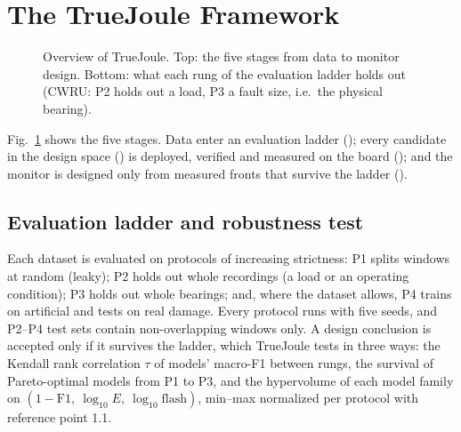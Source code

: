 \documentclass[conference]{IEEEtran}
\newcommand{\TJ}{TrueJoule}
\begin{document}
\section{The \TJ{} Framework}\label{sec:tj}
\begin{figure}[t]
\centering

\caption{Overview of \TJ{}. Top: the five stages from data to monitor design. Bottom: what each rung of the evaluation
ladder holds out (CWRU: P2 holds out a load, P3 a fault size, i.e.\ the physical bearing).}
\label{fig:overview}
\end{figure}

Fig.~\ref{fig:overview} shows the five stages. Data enter an evaluation ladder (); every candidate in the
design space () is deployed, verified and measured on the board (); and the monitor is designed
only from measured fronts that survive the ladder ().

\subsection{Evaluation ladder and robustness test}\label{sec:tj-ladder}
Each dataset is evaluated on protocols of increasing strictness: P1 splits windows at random (leaky); P2 holds out
whole recordings (a load or an operating condition); P3 holds out whole bearings; and, where the dataset allows, P4
trains on artificial and tests on real damage. Every protocol runs with five seeds, and P2--P4 test sets contain
non-overlapping windows only. A design conclusion is accepted only if it survives the ladder, which \TJ{} tests in
three ways: the Kendall rank correlation $\tau$ of models' macro-F1 between rungs, the survival of Pareto-optimal
models from P1 to P3, and the hypervolume \cite{zitzler1999multiobjective} of each model family on
$(1-\mathrm{F1},\ \log_{10}E,\ \log_{10}\mathrm{flash})$, min--max normalized per protocol with reference point 1.1.
\end{document}

